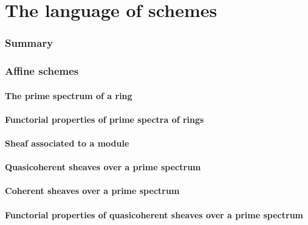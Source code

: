 \clearpage

\setcounter{subsection}{0}
\part{The language of schemes}
    
    \section*{Summary}
    \label{1-schemes.summary}
    

    \section{Affine schemes}
       
        \subsection{The prime spectrum of a ring}
        
       
        \subsection{Functorial properties of prime spectra of rings}
        
       
        \subsection{Sheaf associated to a module}
        
       
        \subsection{Quasicoherent sheaves over a prime spectrum}
        
      
        \subsection{Coherent sheaves over a prime spectrum}
        
       
        \subsection{Functorial properties of quasicoherent sheaves over a prime spectrum}
        
       
